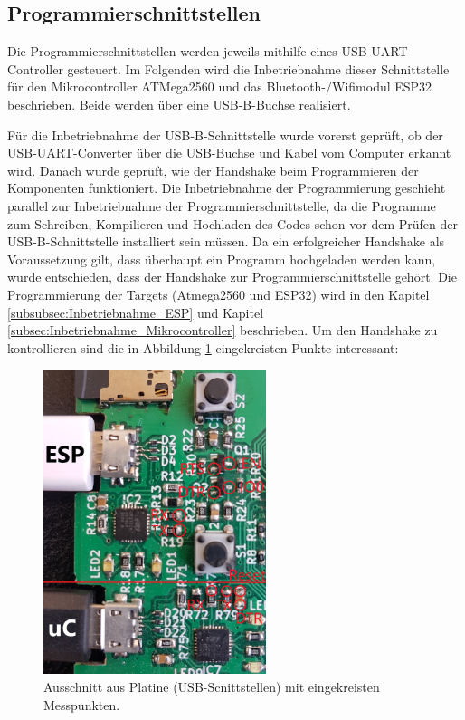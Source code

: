 \newpage
\subsection{Programmierschnittstellen}
\label{sec:Inbetriebnahme_Programmierschnittstellen}

Die Programmierschnittstellen werden jeweils mithilfe eines USB-UART-Controller gesteuert. Im Folgenden wird die Inbetriebnahme dieser Schnittstelle für den Mikrocontroller ATMega2560 und das Bluetooth-/Wifimodul ESP32 beschrieben. Beide werden über eine USB-B-Buchse realisiert.

Für die Inbetriebnahme der USB-B-Schnittstelle wurde vorerst geprüft, ob der USB-UART-Converter über die USB-Buchse und Kabel vom Computer erkannt wird. Danach wurde geprüft, wie der Handshake beim Programmieren der Komponenten funktioniert. Die Inbetriebnahme der Programmierung geschieht parallel zur Inbetriebnahme der Programmierschnittstelle, da die Programme zum Schreiben, Kompilieren und Hochladen des Codes schon vor dem Prüfen der USB-B-Schnittstelle installiert sein müssen. Da ein erfolgreicher Handshake als Voraussetzung gilt, dass überhaupt ein Programm hochgeladen werden kann, wurde entschieden, dass der Handshake zur Programmierschnittstelle gehört. Die Programmierung der Targets (Atmega2560 und ESP32) wird in den Kapitel \ref{subsubsec:Inbetriebnahme_ESP} und Kapitel \ref{subsec:Inbetriebnahme_Mikrocontroller} beschrieben. Um den Handshake zu kontrollieren sind die in Abbildung \ref{fig:USB_B_Print} eingekreisten Punkte interessant:


\begin{figure}[h!]
\center
\includegraphics[width = 0.58\textwidth]{graphics/USB_B_Print}
\caption{Ausschnitt aus Platine (USB-Scnittstellen) mit eingekreisten Messpunkten.}
\label{fig:USB_B_Print}
\end{figure}

